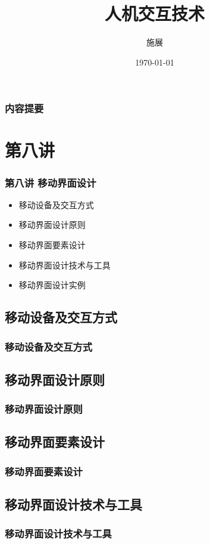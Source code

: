 \documentclass{beamer}
\title{人机交互技术}
\author{施展}
\institute{华中科技大学~武汉光电国家实验室}
\date{\today}
\begin{document}
\begin{frame}
	\frametitle{内容提要}
	\titlepage
\end{frame}

\begin{frame}
	\tableofcontents
\end{frame}

\section{第八讲}
\begin{frame}
	\frametitle{第八讲 移动界面设计}
	\begin{itemize}
		\item 移动设备及交互方式
		\item 移动界面设计原则
		\item 移动界面要素设计
		\item 移动界面设计技术与工具
		\item 移动界面设计实例
	\end{itemize}
\end{frame}

\subsection{移动设备及交互方式}
\begin{frame}
	\frametitle{移动设备及交互方式}

\end{frame}

\subsection{移动界面设计原则}
\begin{frame}
	\frametitle{移动界面设计原则}

\end{frame}

\subsection{移动界面要素设计}
\begin{frame}
	\frametitle{移动界面要素设计}

\end{frame}

\subsection{移动界面设计技术与工具}
\begin{frame}
	\frametitle{移动界面设计技术与工具}

\end{frame}
\end{document}
